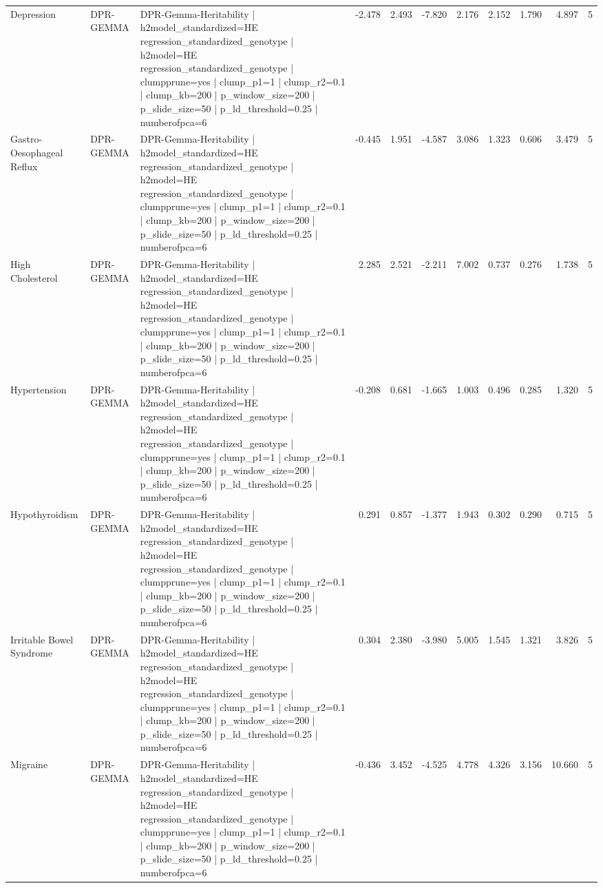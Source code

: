 \begin{landscape}
\begin{longtable}{p{2.4cm}p{1.8cm}p{6.0cm}rrrrrrrr}
Depression & DPR-GEMMA & DPR-Gemma-Heritability | h2model\_standardized=HE regression\_standardized\_genotype | h2model=HE regression\_standardized\_genotype | clumpprune=yes | clump\_p1=1 | clump\_r2=0.1 | clump\_kb=200 | p\_window\_size=200 | p\_slide\_size=50 | p\_ld\_threshold=0.25 | numberofpca=6 & -2.478 & 2.493 & -7.820 & 2.176 & 2.152 & 1.790 & 4.897 & 5 \\
Gastro-Oesophageal Reflux & DPR-GEMMA & DPR-Gemma-Heritability | h2model\_standardized=HE regression\_standardized\_genotype | h2model=HE regression\_standardized\_genotype | clumpprune=yes | clump\_p1=1 | clump\_r2=0.1 | clump\_kb=200 | p\_window\_size=200 | p\_slide\_size=50 | p\_ld\_threshold=0.25 | numberofpca=6 & -0.445 & 1.951 & -4.587 & 3.086 & 1.323 & 0.606 & 3.479 & 5 \\
High Cholesterol & DPR-GEMMA & DPR-Gemma-Heritability | h2model\_standardized=HE regression\_standardized\_genotype | h2model=HE regression\_standardized\_genotype | clumpprune=yes | clump\_p1=1 | clump\_r2=0.1 | clump\_kb=200 | p\_window\_size=200 | p\_slide\_size=50 | p\_ld\_threshold=0.25 | numberofpca=6 & 2.285 & 2.521 & -2.211 & 7.002 & 0.737 & 0.276 & 1.738 & 5 \\
Hypertension & DPR-GEMMA & DPR-Gemma-Heritability | h2model\_standardized=HE regression\_standardized\_genotype | h2model=HE regression\_standardized\_genotype | clumpprune=yes | clump\_p1=1 | clump\_r2=0.1 | clump\_kb=200 | p\_window\_size=200 | p\_slide\_size=50 | p\_ld\_threshold=0.25 | numberofpca=6 & -0.208 & 0.681 & -1.665 & 1.003 & 0.496 & 0.285 & 1.320 & 5 \\
Hypothyroidism & DPR-GEMMA & DPR-Gemma-Heritability | h2model\_standardized=HE regression\_standardized\_genotype | h2model=HE regression\_standardized\_genotype | clumpprune=yes | clump\_p1=1 | clump\_r2=0.1 | clump\_kb=200 | p\_window\_size=200 | p\_slide\_size=50 | p\_ld\_threshold=0.25 | numberofpca=6 & 0.291 & 0.857 & -1.377 & 1.943 & 0.302 & 0.290 & 0.715 & 5 \\
Irritable Bowel Syndrome & DPR-GEMMA & DPR-Gemma-Heritability | h2model\_standardized=HE regression\_standardized\_genotype | h2model=HE regression\_standardized\_genotype | clumpprune=yes | clump\_p1=1 | clump\_r2=0.1 | clump\_kb=200 | p\_window\_size=200 | p\_slide\_size=50 | p\_ld\_threshold=0.25 | numberofpca=6 & 0.304 & 2.380 & -3.980 & 5.005 & 1.545 & 1.321 & 3.826 & 5 \\
Migraine & DPR-GEMMA & DPR-Gemma-Heritability | h2model\_standardized=HE regression\_standardized\_genotype | h2model=HE regression\_standardized\_genotype | clumpprune=yes | clump\_p1=1 | clump\_r2=0.1 | clump\_kb=200 | p\_window\_size=200 | p\_slide\_size=50 | p\_ld\_threshold=0.25 | numberofpca=6 & -0.436 & 3.452 & -4.525 & 4.778 & 4.326 & 3.156 & 10.660 & 5 \\

\end{longtable}
\end{landscape}
